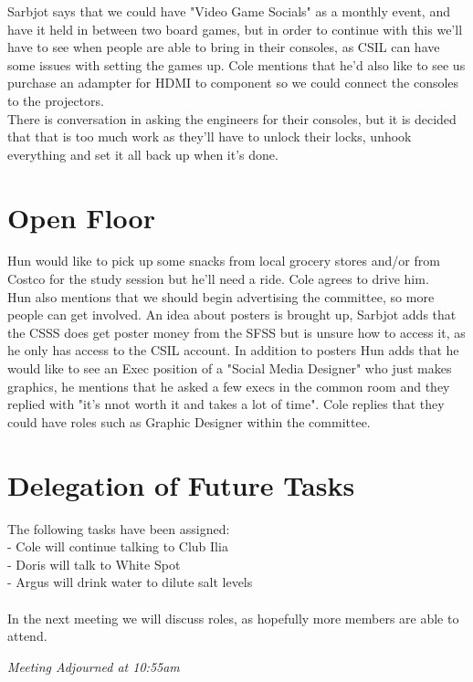 \documentclass[12pt]{article}
\begin{document}
\noindent  Sarbjot says that we could have "Video Game Socials" as a monthly event, and have it held in between two board games, but in order to continue with this we'll have to see when people are able to bring in their consoles, as CSIL can have some issues with setting the games up.  Cole mentions that he'd also like to see us purchase an adampter for HDMI to component so we could connect the consoles to the projectors. \\

\noindent  There is conversation in asking the engineers for their consoles, but it is decided that that is too much work as they'll have to unlock their locks, unhook everything and set it all back up when it's done. 

\section{Open Floor} \label{sec: Open}
Hun would like to pick up some snacks from local grocery stores and/or from Costco for the study session but he'll need a ride. Cole agrees to drive him. \\ 

\noindent Hun also mentions that we should begin advertising the committee, so more people can get involved. An idea about posters is brought up, Sarbjot adds that the CSSS does get poster money from the SFSS but is unsure how to access it, as he only has access to the CSIL account.  In addition to posters Hun adds that he would like to see an Exec position of a "Social Media Designer" who just makes graphics, he mentions that he asked a few execs in the common room and they replied with "it's nnot worth it and takes a lot of time". Cole replies that they could have roles such as Graphic Designer within the committee.

\section{Delegation of Future Tasks} \label{sec: Future}
\noindent The following tasks have been assigned: \\
- Cole will continue talking to Club Ilia\\
- Doris will talk to White Spot  \\
- Argus will drink water to dilute salt levels \\  \\ 
\noindent  In the next meeting we will discuss roles, as hopefully more members are able to attend.

\begin{center}
\em{Meeting Adjourned at 10:55am}
\end{center}
\end{document}
